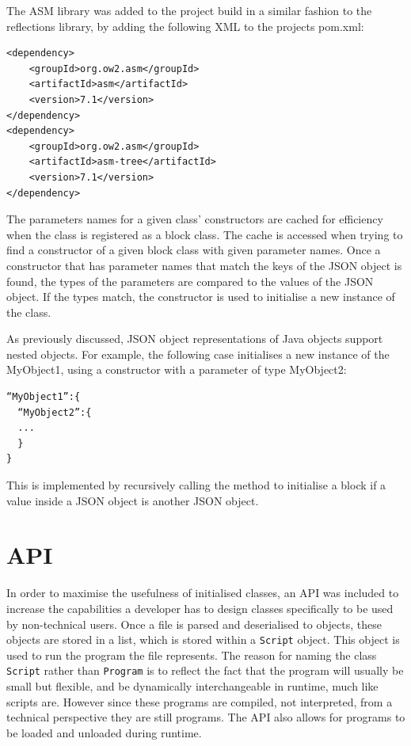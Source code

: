 The ASM library was added to the project build in a similar fashion to the reflections library, by adding the following XML to the projects pom.xml:
\begin{verbatim}
<dependency>
    <groupId>org.ow2.asm</groupId>
    <artifactId>asm</artifactId>
    <version>7.1</version>
</dependency>
<dependency>
    <groupId>org.ow2.asm</groupId>
    <artifactId>asm-tree</artifactId>
    <version>7.1</version>
</dependency>
\end{verbatim}
The parameters names for a given class’ constructors are cached for efficiency when the class is registered as a block class. The cache is accessed when trying to find a constructor of a given block class with given parameter names. Once a constructor that has parameter names that match the keys of the JSON object is found, the types of the parameters are compared to the values of the JSON object. If the types match, the constructor is used to initialise a new instance of the class.\par

As previously discussed, JSON object representations of Java objects support nested objects. For example, the following case initialises a new instance of the MyObject1, using a constructor with a parameter of type MyObject2:
\begin{verbatim}
“MyObject1”:{
  “MyObject2”:{
  ...
  }
}
\end{verbatim}
This is implemented by recursively calling the method to initialise a block if a value inside a JSON object is another JSON object.

\section{API}

In order to maximise the usefulness of initialised classes, an API was included to increase the capabilities a developer has to design classes specifically to be used by non-technical users. Once a file is parsed and deserialised to objects, these objects are stored in a list, which is stored within a \texttt{Script} object. This object is used to run the program the file represents. The reason for naming the class \texttt{Script} rather than \texttt{Program} is to reflect the fact that the program will usually be small but flexible, and be dynamically interchangeable in runtime, much like scripts are. However since these programs are compiled, not interpreted, from a technical perspective they are still programs. The API also allows for programs to be loaded and unloaded during runtime.\par

